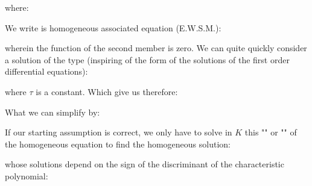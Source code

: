	where:
	
	We write is homogeneous associated equation (E.W.S.M.):
	
	wherein the function of the second member is zero. We can quite quickly consider a solution of the type (inspiring of the form of the solutions of the first order differential equations):
	
	where $\tau$ is a constant. Which give us therefore:
	
	What we can simplify by:
	
	If our starting assumption is correct, we only have to solve in $K$ this ""  or "" of the homogeneous equation to find the homogeneous solution:
	
	whose solutions depend on the sign of the discriminant of the characteristic polynomial:
	
